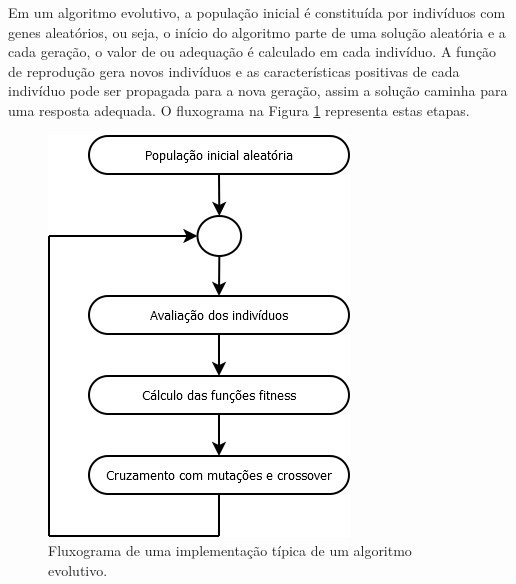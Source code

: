 Em um algoritmo evolutivo, a população inicial é constituída por indivíduos com genes aleatórios, ou seja, o início do algoritmo parte de uma solução aleatória e a cada geração, o valor de \fitness ou adequação é calculado em cada indivíduo. A função de reprodução gera novos indivíduos e as características positivas de cada indivíduo pode ser propagada para a nova geração, assim a solução caminha para uma resposta adequada. O fluxograma na Figura \ref{figura:fluxograma_ae} representa estas etapas.

\begin{figure}[htb]
    \caption{Fluxograma de uma implementação típica de um algoritmo evolutivo.}
    \label{figura:fluxograma_ae}
    \centering
    \includegraphics[scale=1]{images/dia/fluxograma-ae}
    \fautor
\end{figure}